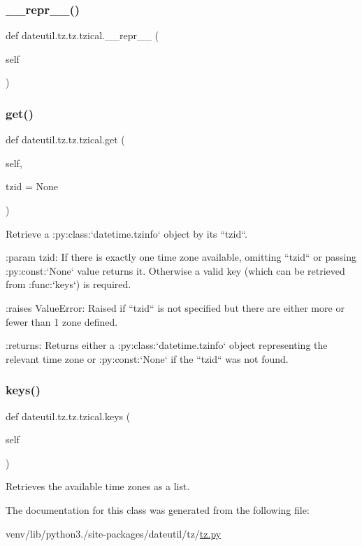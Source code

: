 \subsubsection{\texorpdfstring{\+\_\+\+\_\+repr\+\_\+\+\_\+()}{\_\_repr\_\_()}}
{\footnotesize\ttfamily def dateutil.\+tz.\+tz.\+tzical.\+\_\+\+\_\+repr\+\_\+\+\_\+ (\begin{DoxyParamCaption}\item[{}]{self }\end{DoxyParamCaption})}

\mbox{\label{classdateutil_1_1tz_1_1tz_1_1tzical_ae45347e1bed90941d4767d415dd66bb8}} 
\subsubsection{\texorpdfstring{get()}{get()}}
{\footnotesize\ttfamily def dateutil.\+tz.\+tz.\+tzical.\+get (\begin{DoxyParamCaption}\item[{}]{self,  }\item[{}]{tzid = {\ttfamily None} }\end{DoxyParamCaption})}

\begin{DoxyVerb}Retrieve a :py:class:`datetime.tzinfo` object by its ``tzid``.

:param tzid:
    If there is exactly one time zone available, omitting ``tzid``
    or passing :py:const:`None` value returns it. Otherwise a valid
    key (which can be retrieved from :func:`keys`) is required.

:raises ValueError:
    Raised if ``tzid`` is not specified but there are either more
    or fewer than 1 zone defined.

:returns:
    Returns either a :py:class:`datetime.tzinfo` object representing
    the relevant time zone or :py:const:`None` if the ``tzid`` was
    not found.
\end{DoxyVerb}
 \mbox{\label{classdateutil_1_1tz_1_1tz_1_1tzical_a90cbed637b2fe6f2340107910823efb4}} 
\subsubsection{\texorpdfstring{keys()}{keys()}}
{\footnotesize\ttfamily def dateutil.\+tz.\+tz.\+tzical.\+keys (\begin{DoxyParamCaption}\item[{}]{self }\end{DoxyParamCaption})}

\begin{DoxyVerb}Retrieves the available time zones as a list.
\end{DoxyVerb}
 

The documentation for this class was generated from the following file\+:\begin{DoxyCompactItemize}
\item 
venv/lib/python3./site-\/packages/dateutil/tz/\hyperlink{tz_8py}{tz.\+py}\end{DoxyCompactItemize}
